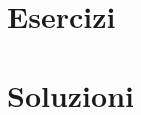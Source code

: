 \documentclass[12pt,openany]{amsbook}
\theoremstyle{plain}
\numberwithin{equation}{section} %
\theoremstyle{definition}
\theoremstyle{remark}
\begin{document}
    

    \tableofcontents

    \part{Esercizi}
    

    \part{Soluzioni}
    
\end{document}
